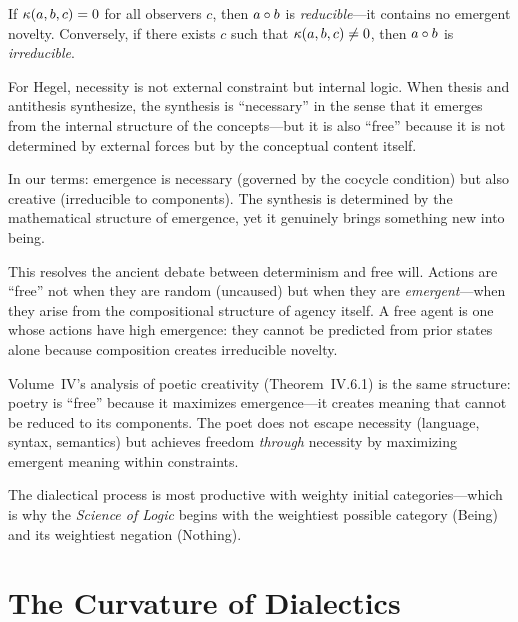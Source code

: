 \begin{theorem}
\label{thm:emergence-necessity}
If $\kappa(a, b, c) = 0$ for all observers $c$, then $a \circ b$ is
\emph{reducible}---it contains no emergent novelty. Conversely, if there exists
$c$ such that $\kappa(a, b, c) \neq 0$, then $a \circ b$ is \emph{irreducible}.
\end{theorem}

\begin{interpretation}
For Hegel, necessity is not external constraint but internal logic. When thesis
and antithesis synthesize, the synthesis is ``necessary'' in the sense that it
emerges from the internal structure of the concepts---but it is also ``free''
because it is not determined by external forces but by the conceptual content
itself.

In our terms: emergence is necessary (governed by the cocycle condition) but
also creative (irreducible to components). The synthesis is determined by the
mathematical structure of emergence, yet it genuinely brings something new into
being.

This resolves the ancient debate between determinism and free will. Actions
are ``free'' not when they are random (uncaused) but when they are \emph{emergent}---when
they arise from the compositional structure of agency itself. A free agent is
one whose actions have high emergence: they cannot be predicted from prior
states alone because composition creates irreducible novelty.

Volume~IV's analysis of poetic creativity (Theorem~IV.6.1) is the same structure:
poetry is ``free'' because it maximizes emergence---it creates meaning that
cannot be reduced to its components. The poet does not escape necessity
(language, syntax, semantics) but achieves freedom \emph{through} necessity by
maximizing emergent meaning within constraints.
\end{interpretation}

\begin{remark}
The dialectical process is most productive with
weighty initial categories---which is why the \emph{Science of Logic} begins
with the weightiest possible category (Being) and its weightiest negation (Nothing).
\end{remark}


\section{The Curvature of Dialectics}

